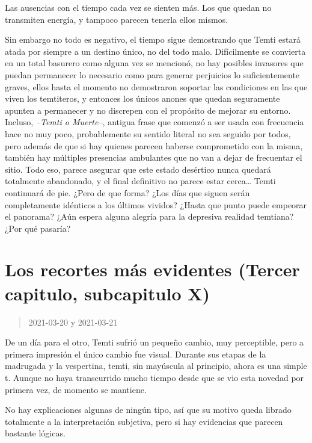 \documentclass[
  spanish,
]{book}
\begin{document}
Las ausencias con el tiempo cada vez se sienten más.
Los que quedan no transmiten energía, y tampoco parecen tenerla ellos mismos.

Sin embargo no todo es negativo, el tiempo sigue demostrando que Temti estará atada por siempre a un destino único, no del todo malo. Difícilmente se convierta en un total basurero como alguna vez se mencionó, no hay posibles invasores que puedan permanecer lo necesario como para generar perjuicios lo suficientemente graves, ellos hasta el momento no demostraron soportar las condiciones en las que viven los temtiteros, y entonces los únicos anones que quedan seguramente apunten a permanecer y no discrepen con el propósito de mejorar su entorno.
Incluso, \emph{--Temti o Muerte--}, antigua frase que comenzó a ser usada con frecuencia hace no muy poco, probablemente su sentido literal no sea seguido por todos, pero además de que si hay quienes parecen haberse comprometido con la misma, también hay múltiples presencias ambulantes que no van a dejar de frecuentar el sitio. Todo eso, parece asegurar que este estado desértico nunca quedará totalmente abandonado, y el final definitivo no parece estar cerca\ldots{} Temti continuará de pie. ¿Pero de que forma? ¿Los días que siguen serán completamente idénticos a los últimos vividos? ¿Hasta que punto puede empeorar el panorama? ¿Aún espera alguna alegría para la depresiva realidad temtiana? ¿Por qué pasaría?

\hypertarget{los-recortes-muxe1s-evidentes-tercer-capitulo-subcapitulo-x}{%
\section{Los recortes más evidentes (Tercer capitulo, subcapitulo X)}\label{los-recortes-muxe1s-evidentes-tercer-capitulo-subcapitulo-x}}

\begin{quote}
2021-03-20 y 2021-03-21
\end{quote}

De un día para el otro, Temti sufrió un pequeño cambio, muy perceptible, pero a primera impresión el único cambio fue visual. Durante sus etapas de la madrugada y la vespertina, temti, sin mayúscula al principio, ahora es una simple t. Aunque no haya transcurrido mucho tiempo desde que se vio esta novedad por primera vez, de momento se mantiene.

No hay explicaciones algunas de ningún tipo, así que su motivo queda librado totalmente a la interpretación subjetiva, pero si hay evidencias que parecen bastante lógicas.
\end{document}
